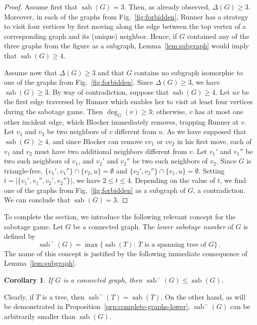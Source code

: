 \documentclass[10pt,a4paper]{amsart}
\newtheorem{corollary}[theorem]{Corollary}
\DeclareMathOperator{\sab}{\mathrm{sab}}
\begin{document}
\begin{proof}
Assume first that $\sab(G) = 3$. Then, as already observed, $\Delta(G)\ge 3$. Moreover, in each of the graphs from Fig.~\ref{fig:forbidden}, Runner has a strategy to visit four vertices by first moving along the edge between the top vertex of a corresponding graph and its (unique) neighbor. Hence, if $G$ contained any of the three graphs from the figure as a subgraph, Lemma~\ref{lem:subgraph} would imply that $\sab(G)\ge 4$.

Assume now that $\Delta(G) \ge 3$ and that $G$ contains no subgraph isomorphic to one of the graphs from Fig.~\ref{fig:forbidden}. Since $\Delta(G) \ge 3$, we have $\sab(G)\ge 3$. By way of contradiction, suppose that $\sab (G)\ge 4$. Let $uv$ be the first edge traversed by Runner which enables her to visit at least four vertices during the sabotage game. Then $\deg_G(v)\ge 3$; otherwise, $v$ has at most one other incident edge, which Blocker immediately removes, trapping Runner at $v$. Let $v_1$ and $v_2$ be two neighbors of $v$ different from $u$. As we have supposed that $\sab (G)\ge 4$, and since Blocker can remove $vv_1$ or $vv_2$ in his first move, each of $v_1$ and $v_2$ must have two additional neighbors different from $v$. Let $v_1'$ and $v_1''$ be two such neighbors of $v_1$, and $v_2'$ and $v_2''$ be two such neighbors of $v_2$. Since $G$ is triangle-free, $\{v_1', v_1''\} \cap \{v_2, u\} = \emptyset$ and $\{v_2', v_2''\} \cap \{v_1, u\} = \emptyset$. Setting $t = |\{v_1', v_1'', v_2', v_2''\}|$, we have $2\le t\le 4$. Depending on the value of $t$, we find one of the graphs from Fig.~\ref{fig:forbidden} as a subgraph of $G$, a contradiction. We can conclude that $\sab(G) = 3$.
\end{proof}

To complete the section, we introduce the following relevant concept for the sabotage game. Let $G$ be a connected graph. The \emph{lower sabotage number} of $G$ is defined by 
$$\sab^{-}(G) = \max\{\sab(T):\ T \text{ is a spanning tree of } G \}\,.$$
The name of this concept is justified by the following immediate consequence of Lemma~\ref{lem:subgraph}. 

\begin{corollary}
\label{cor:sab-versus-sab-minus}
If $G$ is a connected graph, then $\sab^{-}(G) \le \sab(G)$.
\end{corollary}

Clearly, if $T$ is a tree, then $\sab^{-}(T) = \sab(T)$. On the other hand, as will be demonstrated in Proposition~\ref{prp:complete-graphs-lower}, $\sab^{-}(G)$ can be arbitrarily smaller than $\sab(G)$.
\end{document}
